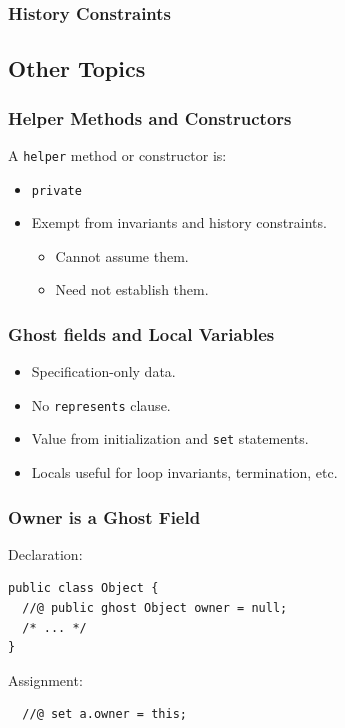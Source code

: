 \begin{frame}[fragile]
\frametitle{History Constraints}



\end{frame}

\subsection[Other]{Other Topics}

\begin{frame}[fragile]
\frametitle{Helper Methods and Constructors}

A \lstinline!helper! method or constructor is:
\begin{itemize}
\item
\lstinline!private!

\item
Exempt from invariants and history constraints.
\begin{itemize}
\item
Cannot assume them.

\item
Need not establish them.
\end{itemize}
\end{itemize}

\end{frame}

\begin{frame}[fragile]
\frametitle{Ghost fields and Local Variables}
\begin{itemize}
\item
Specification-only data.

\item
No \lstinline!represents! clause.

\item
Value from initialization and \lstinline!set! statements.

\item
Locals useful for loop invariants, termination, etc.
\end{itemize}
\end{frame}

\begin{frame}[fragile]
\frametitle{Owner is a Ghost Field}

Declaration:

\begin{lstlisting}
public class Object {
  //@ public ghost Object owner = null;
  /* ... */
}
\end{lstlisting}

Assignment:
\begin{lstlisting}
  //@ set a.owner = this;
\end{lstlisting}
\end{frame}

